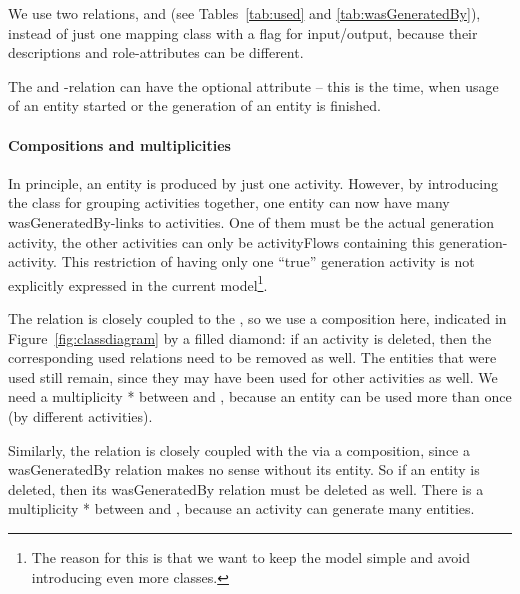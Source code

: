We use two relations,  and  (see Tables~\ref{tab:used} and \ref{tab:wasGeneratedBy}), instead of just one
mapping class with a flag for input/output, because their descriptions and role-attributes
can be different. 

The  and -relation can have the optional attribute  -- this is the time, when usage of an entity started or the generation of an entity is finished.

\paragraph{Compositions and multiplicities}
In principle, an entity is produced by just one activity.
However, by introducing the  class for grouping activities together, 
one entity can now have many wasGeneratedBy-links to activities. One of them must 
be the actual generation activity, the other activities can only be activityFlows 
containing this generation-activity. This restriction of having only one ``true'' generation activity is not explicitly expressed in the current model\footnote{The reason for this is that we want to keep the model simple and avoid introducing even more classes.}.


The  relation is closely coupled to the , so we use a composition here, indicated
in Figure~\ref{fig:classdiagram} by a filled diamond: 
if an activity is deleted, then the corresponding used relations need to be removed as well. 
The entities that were used still remain, since they may have been used for other activities as well.
We need a multiplicity * between  and , because an entity can be used more than once
(by different activities).

Similarly, the  relation is closely coupled with the  via a composition,
since a wasGeneratedBy relation makes no sense without its entity. So if an entity is deleted, 
then its wasGeneratedBy relation must be deleted as well. There is a multiplicity * between 
and , because an activity can generate many entities.


